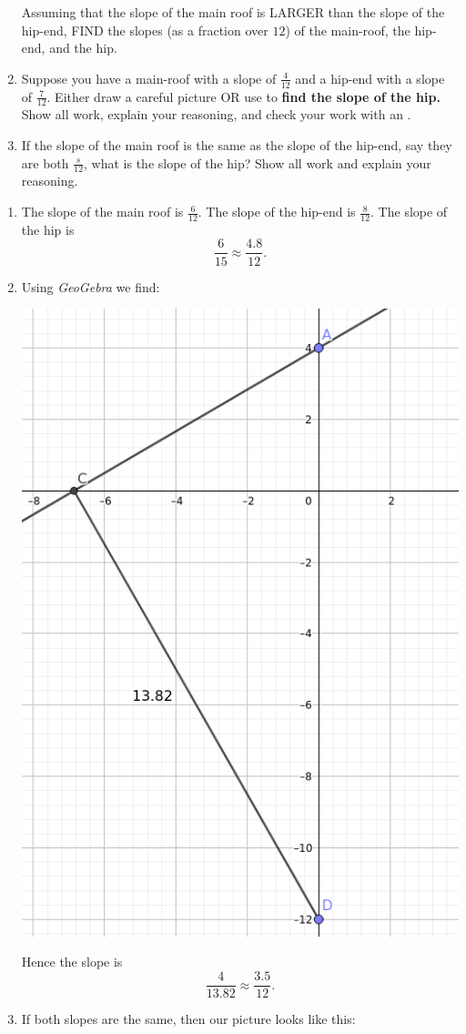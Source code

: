\documentclass[hints,nooutcomes,noauthor]{ximera}
\begin{document}
\begin{question}
\begin{enumerate}
\begin{center}
    \end{center}
    Assuming that the slope of the main roof is LARGER than the slope
    of the hip-end, FIND the slopes (as a fraction over $12$) of the main-roof, the hip-end, and
    the hip. 
  \item Suppose you have a main-roof with a slope of $\frac{4}{12}$
    and a hip-end with a slope of $\frac{7}{12}$. Either draw a
    careful picture OR use
     to
    \textbf{find the slope of the hip.}  Show all work, explain your
    reasoning, and check your work with an .
  \item If the slope of the main roof is the same as the slope of the
    hip-end, say they are both $\frac{s}{12}$, what is the slope of
    the hip? Show all work and explain your reasoning.
  \end{enumerate}
  \begin{freeResponse}
    \begin{enumerate}
    \item The slope of the main roof is $\frac{6}{12}$. The slope of
      the hip-end is $\frac{8}{12}$. The slope of the hip is
      \[
      \frac{6}{15} \approx \frac{4.8}{12}.
      \]
    \item Using \textit{GeoGebra} we find:
      \begin{center}
        \includegraphics[width=.3\textwidth]{workUnEqSlope.png}
      \end{center}
      Hence the slope is
      \[
      \frac{4}{13.82} \approx \frac{3.5}{12}.
      \]
    \item If both slopes are the same, then our picture looks like
      this:
      \begin{center}
        \begin{tikzpicture}[geometryDiagrams,scale=.2]


\end{tikzpicture}
\end{center}
\end{enumerate}
\end{freeResponse}
\end{question}
\end{document}
